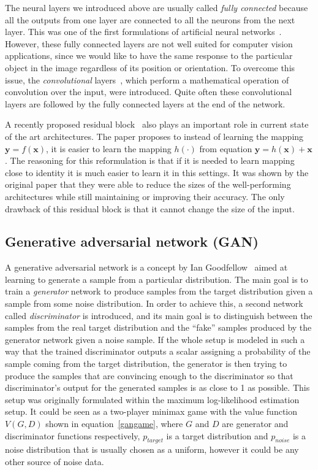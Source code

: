 The neural layers we introduced above are usually called {\em fully connected} because all the outputs from one layer are connected to all the neurons from the next layer. This was one of the first formulations of artificial neural networks~\cite{orignet}. However, these fully connected layers are not well suited for computer vision applications, since we would like to have the same response to the particular object in the image regardless of its position or orientation. To overcome this issue, the {\em convolutional} layers~\cite{convnet}, which perform a mathematical operation of convolution over the input, were introduced. Quite often these convolutional layers are followed by the fully connected layers at the end of the network.

A recently proposed residual block~\cite{resnet} also plays an important role in current state of the art architectures. The paper proposes to instead of learning the mapping $\bm{y} = f(\bm{x})$, it is easier to learn the mapping $h(\cdot)$ from equation $\bm{y} = h(\bm{x}) + \bm{x}$. The reasoning for this reformulation is that if it is needed to learn mapping close to identity it is much easier to learn it in this settings. It was shown by the original paper that they were able to reduce the sizes of the well-performing architectures while still maintaining or improving their accuracy. The only drawback of this residual block is that it cannot change the size of the input.

\subsection{Generative adversarial network (GAN)}

A generative adversarial network is a concept by Ian Goodfellow~\cite{origgan} aimed at learning to generate a sample from a particular distribution. The main goal is to train a {\em generator} network to produce samples from the target distribution given a sample from some noise distribution. In order to achieve this, a second network called {\em discriminator} is introduced, and its main goal is to distinguish between the samples from the real target distribution and the ``fake'' samples produced by the generator network given a noise sample. If the whole setup is modeled in such a way that the trained discriminator outputs a scalar assigning a probability of the sample coming from the target distribution, the generator is then trying to produce the samples that are convincing enough to the discriminator so that discriminator's output for the generated samples is as close to 1 as possible. This setup was originally formulated within the maximum log-likelihood estimation setup. It could be seen as a two-player minimax game with the value function $V(G, D)$ shown in equation~\ref{gangame}, where $G$ and $D$ are generator and discriminator functions respectively, $p_{target}$ is a target distribution and $p_{noise}$ is a noise distribution that is usually chosen as a uniform, however it could be any other source of noise data.

